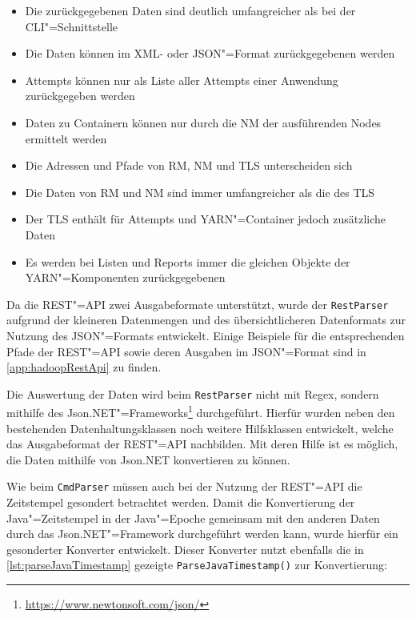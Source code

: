 \begin{itemize}
    \item Die zurückgegebenen Daten sind deutlich umfangreicher als bei der \gls{CLI}"=Schnittstelle
    \item Die Daten können im XML- oder JSON"=Format zurückgegebenen werden
    \item Attempts können nur als Liste aller Attempts einer Anwendung zurückgegeben werden
    \item Daten zu Containern können nur durch die \gls{NM} der ausführenden Nodes ermittelt werden
    \item Die Adressen und Pfade von \gls{RM}, \gls{NM} und \gls{TLS} unterscheiden sich
    \item Die Daten von \gls{RM} und \gls{NM} sind immer umfangreicher als die des \gls{TLS}
    \item Der \gls{TLS} enthält für Attempts und YARN"=Container jedoch zusätzliche Daten
    \item Es werden bei Listen und Reports immer die gleichen Objekte der YARN"=Komponenten zurückgegebenen
\end{itemize}

Da die REST"=API zwei Ausgabeformate unterstützt, wurde der \texttt{RestParser} aufgrund der kleineren Datenmengen und des übersichtlicheren Datenformats zur Nutzung des JSON"=Formats entwickelt.
Einige Beispiele für die entsprechenden Pfade der REST"=API sowie deren Ausgaben im JSON"=Format sind in \cref{app:hadoopRestApi} zu finden.

Die Auswertung der Daten wird beim \texttt{RestParser} nicht mit Regex, sondern mithilfe des Json.NET"=Frameworks\footnote{\url{https://www.newtonsoft.com/json/}} durchgeführt.
Hierfür wurden neben den bestehenden Datenhaltungsklassen noch weitere Hilfsklassen entwickelt, welche das Ausgabeformat der REST"=API nachbilden.
Mit deren Hilfe ist es möglich, die Daten mithilfe von Json.NET konvertieren zu können.

Wie beim \texttt{CmdParser} müssen auch bei der Nutzung der REST"=API die Zeitstempel gesondert betrachtet werden.
Damit die Konvertierung der Java"=Zeitstempel in der Java"=Epoche gemeinsam mit den anderen Daten durch das Json.NET"=Framework durchgeführt werden kann, wurde hierfür ein gesonderter Konverter entwickelt.
Dieser Konverter nutzt ebenfalls die in \cref{lst:parseJavaTimestamp} gezeigte \texttt{ParseJavaTimestamp()} zur Konvertierung:

